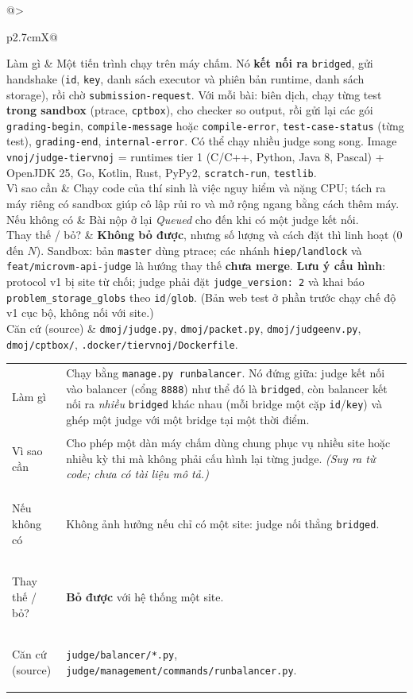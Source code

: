 \documentclass[11pt,a4paper]{article}
\makeatletter
\renewcommand{\c}[1]{\texttt{#1}}
\newcommand{\comp}[6]{%
\begin{tcolorbox}[enhanced,breakable,colback=white,colframe=black!55,boxrule=0.5pt,arc=2pt,
  title={\textbf{#1}},fonttitle=\large,left=4pt,right=4pt,top=3pt,bottom=3pt]
\begin{tabularx}{\linewidth}{@{}>{\bfseries\raggedright}p{2.7cm}X@{}}
Làm gì & #2 \\[2pt]
Vì sao cần & #3 \\[2pt]
Nếu không có & #4 \\[2pt]
Thay thế / bỏ? & #5 \\[2pt]
Căn cứ (source) & \small #6 \\
\end{tabularx}
\end{tcolorbox}}
\makeatother
\begin{document}
\comp{D2. Judge server (\c{judge-server}, image \c{tier-vnoj})}
{Một tiến trình chạy trên máy chấm. Nó \textbf{kết nối ra} \c{bridged}, gửi handshake (\c{id}, \c{key}, danh sách executor và phiên bản runtime, danh sách storage), rồi chờ \c{submission-request}. Với mỗi bài: biên dịch, chạy từng test \textbf{trong sandbox} (ptrace, \c{cptbox}), cho checker so output, rồi gửi lại các gói \c{grading-begin}, \c{compile-message} hoặc \c{compile-error}, \c{test-case-status} (từng test), \c{grading-end}, \c{internal-error}. Có thể chạy nhiều judge song song. Image \c{vnoj/judge-tiervnoj} = runtimes tier 1 (C/C++, Python, Java 8, Pascal) + OpenJDK 25, Go, Kotlin, Rust, PyPy2, \c{scratch-run}, \c{testlib}.}
{Chạy code của thí sinh là việc nguy hiểm và nặng CPU; tách ra máy riêng có sandbox giúp cô lập rủi ro và mở rộng ngang bằng cách thêm máy.}
{Bài nộp ở lại \emph{Queued} cho đến khi có một judge kết nối.}
{\textbf{Không bỏ được}, nhưng số lượng và cách đặt thì linh hoạt (0 đến $N$). Sandbox: bản \c{master} dùng ptrace; các nhánh \c{hiep/landlock} và \c{feat/microvm-api-judge} là hướng thay thế \textbf{chưa merge}. \textbf{Lưu ý cấu hình}: protocol v1 bị site từ chối; judge phải đặt \c{judge\_version: 2} và khai báo \c{problem\_storage\_globs} theo \c{id}/\c{glob}. (Bản web test ở phần trước chạy chế độ v1 cục bộ, không nối với site.)}
{\c{dmoj/judge.py}, \c{dmoj/packet.py}, \c{dmoj/judgeenv.py}, \c{dmoj/cptbox/}, \c{.docker/tiervnoj/Dockerfile}.}

\comp{D3. Balancer (tuỳ chọn)}
{Chạy bằng \c{manage.py runbalancer}. Nó đứng giữa: judge kết nối vào balancer (cổng \c{8888}) như thể đó là \c{bridged}, còn balancer kết nối ra \emph{nhiều} \c{bridged} khác nhau (mỗi bridge một cặp \c{id}/\c{key}) và ghép một judge với một bridge tại một thời điểm.}
{Cho phép một dàn máy chấm dùng chung phục vụ nhiều site hoặc nhiều kỳ thi mà không phải cấu hình lại từng judge. \textit{(Suy ra từ code; chưa có tài liệu mô tả.)}}
{Không ảnh hưởng nếu chỉ có một site: judge nối thẳng \c{bridged}.}
{\textbf{Bỏ được} với hệ thống một site.}
{\c{judge/balancer/*.py}, \c{judge/management/commands/runbalancer.py}.}
\end{document}
